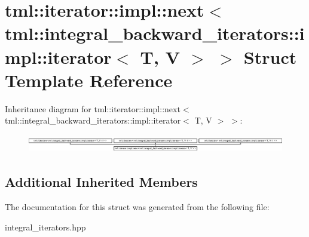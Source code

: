 \hypertarget{structtml_1_1iterator_1_1impl_1_1next_3_01tml_1_1integral__backward__iterators_1_1impl_1_1iterator_3_01T_00_01V_01_4_01_4}{\section{tml\+:\+:iterator\+:\+:impl\+:\+:next$<$ tml\+:\+:integral\+\_\+backward\+\_\+iterators\+:\+:impl\+:\+:iterator$<$ T, V $>$ $>$ Struct Template Reference}
\label{structtml_1_1iterator_1_1impl_1_1next_3_01tml_1_1integral__backward__iterators_1_1impl_1_1iterator_3_01T_00_01V_01_4_01_4}
}
Inheritance diagram for tml\+:\+:iterator\+:\+:impl\+:\+:next$<$ tml\+:\+:integral\+\_\+backward\+\_\+iterators\+:\+:impl\+:\+:iterator$<$ T, V $>$ $>$\+:\begin{figure}[H]
\begin{center}
\leavevmode
\includegraphics[height=0.806336cm]{structtml_1_1iterator_1_1impl_1_1next_3_01tml_1_1integral__backward__iterators_1_1impl_1_1iterator_3_01T_00_01V_01_4_01_4}
\end{center}
\end{figure}
\subsection*{Additional Inherited Members}


The documentation for this struct was generated from the following file\+:\begin{DoxyCompactItemize}
\item 
integral\+\_\+iterators.\+hpp\end{DoxyCompactItemize}

